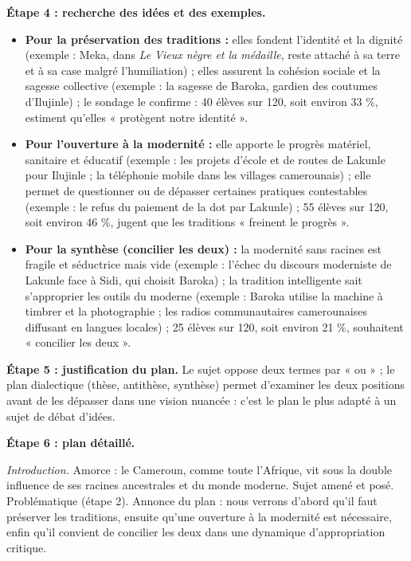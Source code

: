\documentclass[11pt]{article}
\begin{document}
\begin{exoresolu}
\textbf{Étape 4 : recherche des idées et des exemples.}
\begin{itemize}
\item \textbf{Pour la préservation des traditions :} elles fondent l'identité et la dignité (exemple : Meka, dans \emph{Le Vieux nègre et la médaille}, reste attaché à sa terre et à sa case malgré l'humiliation) ; elles assurent la cohésion sociale et la sagesse collective (exemple : la sagesse de Baroka, gardien des coutumes d'Ilujinle) ; le sondage le confirme : 40 élèves sur 120, soit environ 33 \%, estiment qu'elles « protègent notre identité ».
\item \textbf{Pour l'ouverture à la modernité :} elle apporte le progrès matériel, sanitaire et éducatif (exemple : les projets d'école et de routes de Lakunle pour Ilujinle ; la téléphonie mobile dans les villages camerounais) ; elle permet de questionner ou de dépasser certaines pratiques contestables (exemple : le refus du paiement de la dot par Lakunle) ; 55 élèves sur 120, soit environ 46 \%, jugent que les traditions « freinent le progrès ».
\item \textbf{Pour la synthèse (concilier les deux) :} la modernité sans racines est fragile et séductrice mais vide (exemple : l'échec du discours moderniste de Lakunle face à Sidi, qui choisit Baroka) ; la tradition intelligente sait s'approprier les outils du moderne (exemple : Baroka utilise la machine à timbrer et la photographie ; les radios communautaires camerounaises diffusant en langues locales) ; 25 élèves sur 120, soit environ 21 \%, souhaitent « concilier les deux ».
\end{itemize}

\textbf{Étape 5 : justification du plan.} Le sujet oppose deux termes par « ou » ; le plan dialectique (thèse, antithèse, synthèse) permet d'examiner les deux positions avant de les dépasser dans une vision nuancée : c'est le plan le plus adapté à un sujet de débat d'idées.

\textbf{Étape 6 : plan détaillé.}

\emph{Introduction.} Amorce : le Cameroun, comme toute l'Afrique, vit sous la double influence de ses racines ancestrales et du monde moderne. Sujet amené et posé. Problématique (étape 2). Annonce du plan : nous verrons d'abord qu'il faut préserver les traditions, ensuite qu'une ouverture à la modernité est nécessaire, enfin qu'il convient de concilier les deux dans une dynamique d'appropriation critique.


\end{exoresolu}
\end{document}
